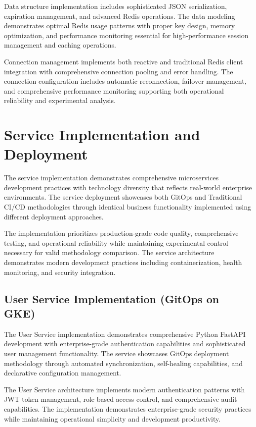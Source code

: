 Data structure implementation includes sophisticated JSON serialization, expiration management, and advanced Redis operations. The data modeling demonstrates optimal Redis usage patterns with proper key design, memory optimization, and performance monitoring essential for high-performance session management and caching operations.

Connection management implements both reactive and traditional Redis client integration with comprehensive connection pooling and error handling. The connection configuration includes automatic reconnection, failover management, and comprehensive performance monitoring supporting both operational reliability and experimental analysis.

\section{Service Implementation and Deployment}

The service implementation demonstrates comprehensive microservices development practices with technology diversity that reflects real-world enterprise environments. The service deployment showcases both GitOps and Traditional CI/CD methodologies through identical business functionality implemented using different deployment approaches.

The implementation prioritizes production-grade code quality, comprehensive testing, and operational reliability while maintaining experimental control necessary for valid methodology comparison. The service architecture demonstrates modern development practices including containerization, health monitoring, and security integration.

\subsection{User Service Implementation (GitOps on GKE)}

The User Service implementation demonstrates comprehensive Python FastAPI development with enterprise-grade authentication capabilities and sophisticated user management functionality. The service showcases GitOps deployment methodology through automated synchronization, self-healing capabilities, and declarative configuration management.

The User Service architecture implements modern authentication patterns with JWT token management, role-based access control, and comprehensive audit capabilities. The implementation demonstrates enterprise-grade security practices while maintaining operational simplicity and development productivity.

